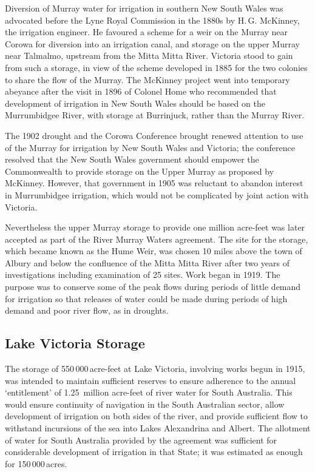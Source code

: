 Diversion of Murray water for irrigation in southern New South Wales
was advocated before the Lyne Royal Commission in the 1880s by
H.\,G. McKinney,  the irrigation engineer.  He
favoured a scheme for a weir on the Murray  near
Corowa  for diversion into an irrigation
canal, and storage on the upper
Murray near Talmalmo,  upstream from the Mitta
Mitta River.  Victoria stood to gain from
such a storage, in view of the scheme developed in 1885 for the two
colonies to share the flow of the Murray.  The McKinney project went
into temporary abeyance after the visit in 1896 of Colonel Home who
recommended that development of irrigation in New South Wales should
be based on the Murrumbidgee River,  with
storage at Burrinjuck,
 rather than the Murray
River.

The 1902 drought and the Corowa Conference brought
renewed attention to use of the Murray for irrigation by New South
Wales and Victoria; the conference resolved that the New South Wales
government should empower the Commonwealth to provide storage on the
Upper Murray as proposed by McKinney.  However, that government in
1905 was reluctant to abandon interest in Murrumbidgee irrigation,
which would not be complicated by joint action with
Victoria.

Nevertheless the upper Murray storage to provide one million acre-feet
was later accepted as part of the River Murray Waters agreement. The
site for the storage, which became known as the Hume Weir,
 was chosen 10 miles above the town of Albury
 and below the confluence of the Mitta Mitta River
after two years of investigations including examination of 25 sites.
Work began in 1919.  The purpose was to conserve some of the peak
flows during periods of little demand for irrigation so that releases
of water could be made during periods of high demand and poor river
flow, as in droughts.

\subsection*{Lake Victoria Storage}

The storage of 550\,000\,acre-feet at Lake Victoria, involving works
begun in 1915, was intended to maintain sufficient reserves to ensure
adherence to the annual `entitlement' of 1.25~million acre-feet of
river water for South Australia.  This would ensure continuity of
navigation in the South Australian sector, allow development of
irrigation on both sides of the river, and provide sufficient flow to
withstand incursions of the sea into Lakes Alexandrina and
Albert.  The allotment of
water for South Australia provided by the agreement was sufficient for
considerable development of irrigation in that State; it was estimated
as enough for 150\,000\,acres.

